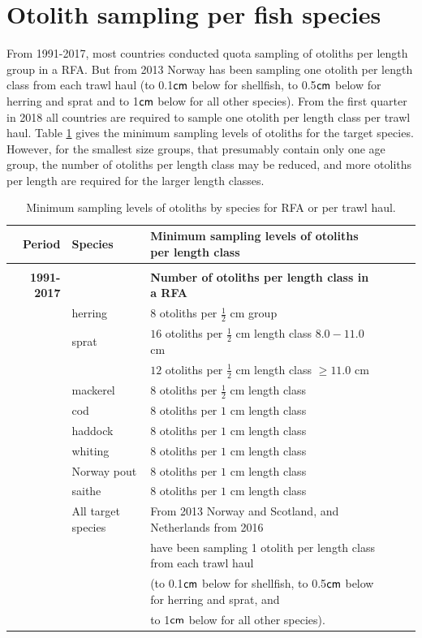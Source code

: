 \documentclass[a4paper 12pt]{article}
\numberwithin{equation}{section}
\newcommand{\cm}{\textnormal{\sffamily cm}\xspace}
\begin{document}
{%
\section{\large Otolith sampling per fish species}
\label{secAp:otolithappendix}
From 1991-2017, most countries conducted quota sampling of otoliths per length group in a RFA. But from 2013 Norway has been sampling one otolith per length class from each trawl haul (to 0.1$\cm$ below for shellfish, to 0.5$\cm$ below for herring and sprat and to 1$\cm$ below for all other species). From the first quarter in 2018 all countries are required to sample one otolith per length class per trawl haul.  Table \ref{tab:otolithsTable} gives the minimum sampling levels of otoliths for the target species. However, for the smallest size groups, that presumably contain only one age group, the number of otoliths per length class may be reduced, and more otoliths per length are required for the larger length classes. %
\begin{small}
\begin{table}[h!]
\centering
\caption{Minimum sampling levels of otoliths by species for RFA or per trawl haul.}
\label{tab:otolithsTable}
\begin{tabularx}{\linewidth}{r l l l l X}
\toprule 
Period &  Species  & Minimum sampling levels of otoliths per length class    \\[0.7ex]
\midrule \\[0.1ex]
{\bf 1991-2017} & & {\bf Number of otoliths per length class in a RFA}  \\[1.0ex]
     & herring  &  $8$  otoliths per $\frac{1}{2}$ cm group \\[0.5ex]
     & sprat    & $16$  otoliths per $\frac{1}{2}$ cm length class  $8.0 -11.0$ cm\\[0.5ex]
              & & $12$  otoliths per $\frac{1}{2}$ cm length class  $\geq 11.0$ cm\\[0.5ex]
& mackerel      & $8$  otoliths per $\frac{1}{2}$ cm length class \\[0.5ex]
& cod       	  & $8$  otoliths per $1$ cm length class\\[0.5ex]
&haddock   	  & $8$  otoliths per $1$ cm length class \\[0.5ex]
&whiting    	  & $8$  otoliths per $1$ cm length class \\[0.5ex]
&Norway pout   & $8$  otoliths per $1$ cm length class\\[0.5ex]
&saithe        & $8$  otoliths per $1$ cm length class \\[1ex] 
& All target species      &  From 2013 Norway and Scotland, and  Netherlands from 2016 \\[0.7ex] 
&& have been sampling 1 otolith per length class from each trawl haul \\[0.7ex] 
&& (to 0.1$\cm$ below for shellfish, to 0.5$\cm$ below for herring and sprat, and \\ [0.7ex] 
&& to 1$\cm$ below for all other species).\\[1.7ex] 


\end{tabularx}
\end{table}
\end{small}}
\end{document}

